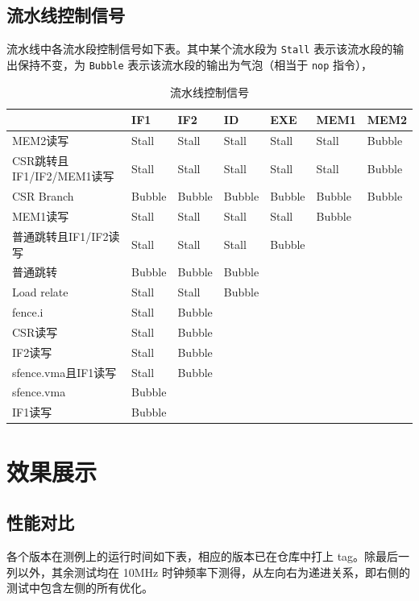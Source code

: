 \documentclass[12pt,a4paper,oneside]{ctexart}
\begin{document}
\subsection{流水线控制信号} \label{pipeline-control}

流水线中各流水段控制信号如下表。其中某个流水段为 \texttt{Stall} 表示该流水段的输出保持不变，为 \texttt{Bubble} 表示该流水段的输出为气泡（相当于 \texttt{nop} 指令），

\begin{table}[H]
\caption{流水线控制信号}
\begin{tabular}{lllllll}
 & IF1 & IF2 & ID & EXE & MEM1 & MEM2 \\
 \hline
MEM2读写 & Stall & Stall & Stall & Stall & Stall & Bubble \\
CSR跳转且IF1/IF2/MEM1读写 & Stall & Stall & Stall & Stall & Stall & Bubble \\
CSR Branch & Bubble & Bubble & Bubble & Bubble & Bubble & Bubble \\
MEM1读写 & Stall & Stall & Stall & Stall & Bubble &  \\
普通跳转且IF1/IF2读写 & Stall & Stall & Stall & Bubble &   &   \\
普通跳转 & Bubble & Bubble & Bubble &   &   &   \\
Load relate & Stall & Stall & Bubble &   &   &   \\
fence.i & Stall & Bubble &   &   &   &   \\
CSR读写 & Stall & Bubble &   &   &   &   \\
IF2读写 & Stall & Bubble &   &   &   &   \\
sfence.vma且IF1读写 & Stall & Bubble &   &   &   &   \\
sfence.vma & Bubble &   &   &   &   &   \\
IF1读写 & Bubble &   &   &   &   &   \\
\end{tabular}
\end{table}

\section{效果展示}
\subsection{性能对比}
各个版本在测例上的运行时间如下表，相应的版本已在仓库中打上 tag。除最后一列以外，其余测试均在 10MHz 时钟频率下测得，从左向右为递进关系，即右侧的测试中包含左侧的所有优化。
\end{document}
